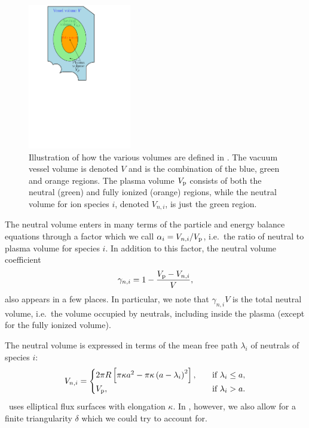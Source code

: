\documentclass{notes}
\newcommand{\Vp}{V_{\rm p}}
\begin{document}
    \begin{figure}
        \centering
        \includegraphics[width=0.4\textwidth]{figs/startup_volume.pdf}
        \caption{Illustration of how the various volumes are defined in \DYON.
        The vacuum vessel volume is denoted $V$ and is the combination of the
        blue, green and orange regions. The plasma volume $\Vp$ consists of both
        the neutral (green) and fully ionized (orange) regions, while the
        neutral volume for ion species $i$, denoted $V_{n,i}$, is just the green
        region.
        }
        \label{fig:volumes}
    \end{figure}

    The neutral volume enters in many terms of the particle and energy balance
    equations through a factor which we call $\alpha_i = V_{n,i}/\Vp$, i.e.\
    the ratio of neutral to plasma volume for species $i$. In addition to this
    factor, the neutral volume coefficient
    \begin{equation}
        \gamma_{n,i} = 1 - \frac{\Vp-V_{n,i}}{V},
    \end{equation}
    also appears in a few places. In particular, we note that $\gamma_{n,i}V$ is
    the total neutral volume, i.e.\ the volume occupied by neutrals, including
    inside the plasma (except for the fully ionized volume).

    The neutral volume is expressed in terms of the mean free path $\lambda_i$
    of neutrals of species $i$:
    \begin{equation}
        V_{n,i} = \begin{cases}
            2\pi R\left[ \pi\kappa a^2 - \pi\kappa\left( a - \lambda_i \right)^2\right], &\quad\text{if }\lambda_i\leq a,\\
            \Vp, &\quad\text{if }\lambda_i > a.
        \end{cases}
    \end{equation}
    \DYON\ uses elliptical flux surfaces with elongation $\kappa$. In \DREAM,
    however, we also allow for a finite triangularity $\delta$ which we could
    try to account for. 
\end{document}
